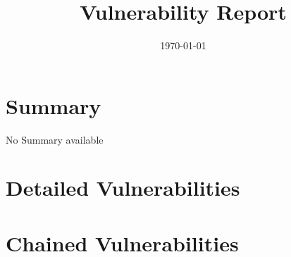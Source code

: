 \documentclass{article}%
\title{Vulnerability Report}%
\date{\today}%
\begin{document}
%
\normalsize%
\maketitle%
\section{Summary}%
\label{sec:Summary}%
No Summary available

%
\section{Detailed Vulnerabilities}%
\label{sec:DetailedVulnerabilities}%

%
\section{Chained Vulnerabilities}%
\label{sec:ChainedVulnerabilities}%

%
\end{document}
